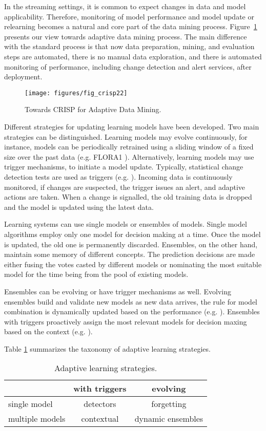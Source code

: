 \documentclass{llncs}
\begin{document}
In the streaming settings, it is common to expect changes in data and model applicability. Therefore, monitoring of model performance and model update or relearning becomes a natural and core part of the data mining process.
Figure~\ref{fig:crisp_adm} presents our view towards adaptive data mining process. The main difference with the standard process is that now data preparation, mining, and evaluation steps are automated, there is no manual data exploration, and there is automated monitoring of performance, including change detection and alert services, after deployment.
\begin{figure}
\centering
\texttt{[image: figures/fig\_crisp22]}
\caption{Towards CRISP for Adaptive Data Mining.}
\label{fig:crisp_adm}
\end{figure}

Different strategies for updating learning models have been developed.
Two main strategies can be distinguished. Learning models may evolve continuously, for instance, models can be periodically retrained using a sliding window of a fixed size over the past data (e.g. FLORA1 \cite{Widmer96}). Alternatively, learning models may use trigger mechanisms, to initiate a model update. 
Typically, statistical change detection tests are used as triggers (e.g. \cite{Gama04}). Incoming data is continuously monitored, if changes are suspected, the trigger issues an alert, and adaptive actions are taken. When a change is signalled, the old training data is dropped and the model is updated using the latest data.

Learning systems can use single models or ensembles of models.
Single model algorithms employ only one model for decision making at a time.
Once the model is updated, the old one is permanently discarded.
Ensembles, on the other hand, maintain some memory of different concepts.
The prediction decisions are made either fusing the votes casted by different models or nominating the most suitable model for the time being from the pool of existing models.

Ensembles can be evolving or have trigger mechanisms as well. Evolving ensembles build and validate new models as new data arrives, the rule for model combination is dynamically updated based on the performance (e.g. \cite{Minku10}). Ensembles with triggers proactively assign the most relevant models for decision maxing based on the context (e.g. \cite{Tsymbal08}). 

Table \ref{fig:methods} summarizes the taxonomy of adaptive learning strategies.
\begin{table}[h]
\centering
\caption{Adaptive learning strategies.}
{\footnotesize
\begin{tabular}{|l|cc|}
\hline
	& with triggers & evolving \\ \hline
single model & detectors & forgetting \\
multiple models & contextual & dynamic ensembles\\	
\hline
\end{tabular}
}
\label{fig:methods}
\end{table}
\end{document}
